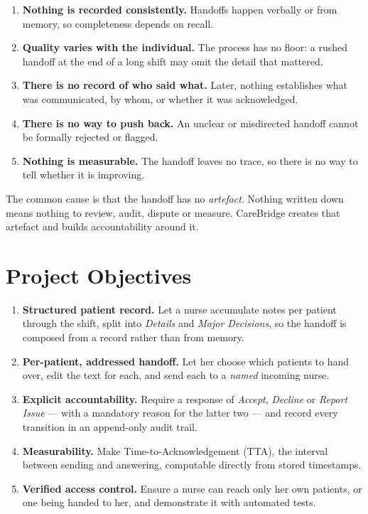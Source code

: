 \documentclass{tietreport}
\begin{document}
\begin{enumerate}
  \item \textbf{Nothing is recorded consistently.} Handoffs
    happen verbally or from memory, so completeness depends
    on recall.
  \item \textbf{Quality varies with the individual.} The
    process has no floor: a rushed handoff at the end of a
    long shift may omit the detail that mattered.
  \item \textbf{There is no record of who said what.} Later,
    nothing establishes what was communicated, by whom, or
    whether it was acknowledged.
  \item \textbf{There is no way to push back.} An unclear or
    misdirected handoff cannot be formally rejected or
    flagged.
  \item \textbf{Nothing is measurable.} The handoff leaves
    no trace, so there is no way to tell whether it is
    improving.
\end{enumerate}

The common cause is that the handoff has no \emph{artefact}.
Nothing written down means nothing to review, audit, dispute
or measure. CareBridge creates that artefact and builds
accountability around it.

\section{Project Objectives}

\begin{enumerate}
  \item \textbf{Structured patient record.} Let a nurse
    accumulate notes per patient through the shift, split
    into \emph{Details} and \emph{Major Decisions}, so the
    handoff is composed from a record rather than from
    memory.
  \item \textbf{Per-patient, addressed handoff.} Let her
    choose which patients to hand over, edit the text for
    each, and send each to a \emph{named} incoming nurse.
  \item \textbf{Explicit accountability.} Require a
    response of \emph{Accept}, \emph{Decline} or
    \emph{Report Issue} --- with a mandatory reason for the
    latter two --- and record every transition in an
    append-only audit trail.
  \item \textbf{Measurability.} Make Time-to-Acknowledgement
    (TTA), the interval between sending and answering,
    computable directly from stored timestamps.
  \item \textbf{Verified access control.} Ensure a nurse can
    reach only her own patients, or one being handed to her,
    and demonstrate it with automated tests.
\end{enumerate}
\end{document}

